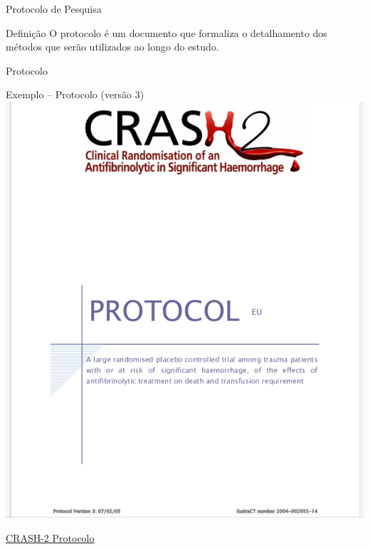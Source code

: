 \documentclass{beamer}
\begin{document}
\begin{frame}{Protocolo de Pesquisa}
  \begin{block}{Definição}
    \footnotesize
    O protocolo é um documento que formaliza o detalhamento dos métodos que serão utilizados ao longo do estudo.
  \end{block}
\end{frame}


\begin{frame}{Protocolo}
  \begin{exampleblock}{Exemplo -- Protocolo (versão 3)}
    \centering
    \includegraphics[height=.8\textheight]{Planejamento/CRASH-proto1}

  \end{exampleblock}
  \vfill
  \scriptsize
  \hfill \href{http://www.crash2.lshtm.ac.uk/Protocol_Eng.html}{CRASH-2 Protocolo}
\end{frame}
\end{document}
